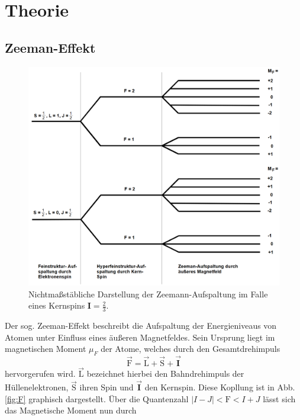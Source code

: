 \section{Theorie}
\label{sec:Theorie}

\subsection{Zeeman-Effekt}
\begin{figure}
  \centering
  \includegraphics{./Niveaus.PNG}
  \caption{Nichtmaßstäbliche Darstellung der Zeemann-Aufspaltung im Falle eines Kernspins $\mathbf{I}= \frac{2}{3}$\cite{Anleitung}.}
  \label{fig:Zeemann}
\end{figure}
Der sog. Zeeman-Effekt beschreibt die Aufspaltung der Energieniveaus von Atomen unter Einfluss eines äußeren Magnetfeldes.
Sein Ursprung liegt im magnetischen Moment $\mu_F$ der Atome, welches durch den Gesamtdrehimpuls
\begin{equation}
  \vec{\text{F}}=\vec{\text{L}}+\vec{\text{S}}+\vec{\mathbf{I}}
  \label{eqn:F}
\end{equation}
hervorgerufen wird. $\vec{\text{L}}$ bezeichnet hierbei den Bahndrehimpuls der Hüllenelektronen, $\vec{\text{S}}$ ihren Spin und $\vec{\mathbf{I}}$ den Kernspin. Diese Kopllung ist in Abb. \ref{fig:F} graphisch dargestellt.
Über die Quantenzahl $|I-J|<\text{F}<I+J$ lässt sich das Magnetische Moment nun durch

